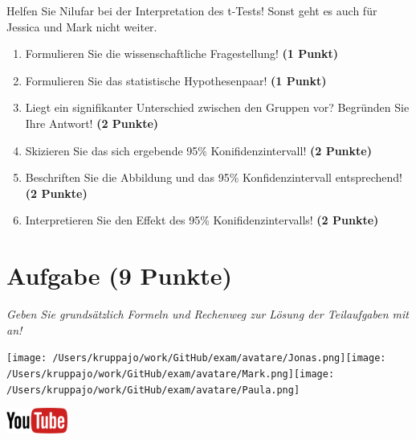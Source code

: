 \documentclass[a4paper, 9pt]{scrartcl}\usepackage[]{graphicx}\usepackage[]{xcolor}
\begin{document}
Helfen Sie Nilufar bei der Interpretation des t-Tests! Sonst geht es auch für Jessica und Mark nicht weiter.

\begin{enumerate}
  \item Formulieren Sie die wissenschaftliche Fragestellung! \textbf{(1 Punkt)}
  \item Formulieren Sie das statistische Hypothesenpaar! \textbf{(1 Punkt)}
\item Liegt ein signifikanter Unterschied zwischen den Gruppen vor? Begründen Sie Ihre Antwort! \textbf{(2 Punkte)}
\item Skizieren Sie das sich ergebende 95\% Konifidenzintervall! \textbf{(2 Punkte)}
\item Beschriften Sie die Abbildung und das 95\% Konfidenzintervall entsprechend! \textbf{(2 Punkte)}  
\item Interpretieren Sie den Effekt des 95\% Konifidenzintervalls! \textbf{(2 Punkte)}
\end{enumerate} 
\clearpage

\section{Aufgabe \hfill (9 Punkte)}

\textit{Geben Sie grundsätzlich Formeln und Rechenweg zur Lösung der Teilaufgaben mit an!} \\[1Ex]
 

 
\begin{minipage}[t]{0.5\textwidth}
\texttt{[image: /Users/kruppajo/work/GitHub/exam/avatare/Jonas.png]}\hspace{-4mm}\texttt{[image: /Users/kruppajo/work/GitHub/exam/avatare/Mark.png]}\hspace{-4mm}\texttt{[image: /Users/kruppajo/work/GitHub/exam/avatare/Paula.png]}
\end{minipage}
\begin{minipage}[t]{0.5\textwidth}
\hfill
\href{https://youtu.be/w62HJlbN28U}{\includegraphics[width = 2cm]{img/youtube}}
\end{minipage}
\vspace{1ex}
\end{document}
